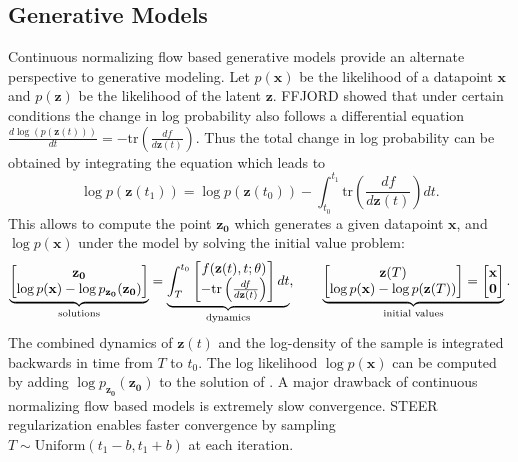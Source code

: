 \subsection{Generative Models}
Continuous normalizing flow based generative models \cite{grathwohl2018ffjord, chen2018neural} provide an alternate perspective to generative modeling. 
Let $ p( \mathbf{x} )$ be the likelihood of a datapoint $\mathbf{x}$ and $p( \mathbf{z} )$ be the likelihood of the latent $\mathbf{z}$. 
FFJORD \cite{grathwohl2018ffjord} showed that under certain conditions the change in log probability also follows a differential equation $\frac{d \log(p( \mathbf{z}(t)))}{d t} = -\text{tr} \left( \frac{df}{d \mathbf{z} (t)} \right)$. Thus the total change in log probability can be obtained by integrating the equation which leads to %
\begin{equation}
	\log p( \mathbf{z} (t_1)) = \log p( \mathbf{z} (t_0)) - \int_{t_0}^{t_1} \text{tr} \left( \frac{df}{d \mathbf{z} (t)} \right) dt.  
\end{equation}
This allows to compute the point $\mathbf{z_0}$ which generates a given datapoint $\mathbf{x}$, and $\log p( \mathbf{x} )$ under the model by solving the initial value problem:
\begin{align}\label{eq:reverseivp} 
	\underbrace{\begin{bmatrix}
			\mathbf{z_0} \\ \log p(\mathbf{x}) - \log p_{\mathbf{z_0}}(\mathbf{z_0})
	\end{bmatrix}}_{\textnormal{solutions}} = \underbrace{\int_{T}^{t_0}
		\begin{bmatrix}
			f( \mathbf{z} (t), t; \theta) \\ - \text{tr} \left( \frac{df}{d \mathbf{z}(t)} \right) 
		\end{bmatrix}dt}_{\textnormal{dynamics}},\qquad
	\underbrace{\begin{bmatrix}
			\mathbf{z}(T) \\ \log p(\mathbf{x}) - \log p(\mathbf{z}(T))
		\end{bmatrix} = 
		\begin{bmatrix}
			\mathbf{x} \\ \mathbf{0}
	\end{bmatrix}  }_{\textnormal{initial values}} .
\end{align}
The combined dynamics of $\mathbf{z}(t)$ and the log-density of the sample is integrated backwards in time from $T$ to $t_0$. The log likelihood $\log p(\mathbf{x})$ can be computed by adding $\log p_{\mathbf{z_0}}(\mathbf{z_0})$ to the solution of . A major drawback of continuous normalizing flow based models is extremely slow convergence.
STEER regularization enables faster convergence by sampling $T \sim \text{Uniform}(t_1-b,t_1+b)$ at each iteration.

